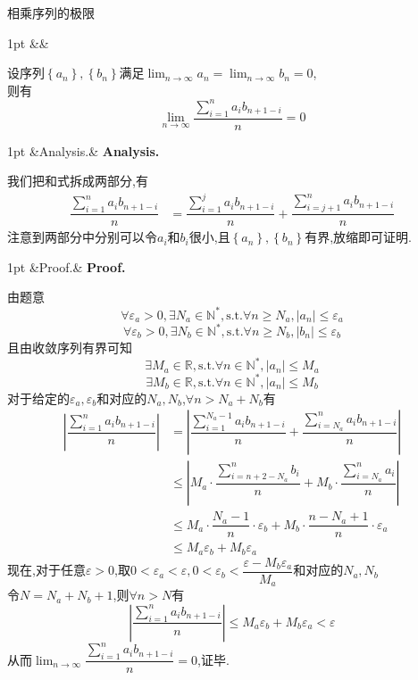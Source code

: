 \documentclass{ctexart}
\newcommand{\R}{\mathbb{R}}
\newcommand{\N}{\mathbb{N}}
\newcommand{\ep}{\varepsilon}
\newcommand{\st}{,\text{s.t.}}
\newenvironment{formal}[1][]{%
\def\FrameCommand{%
\hspace{1pt}%
{\color{DarkBlue}\vrule width 2pt}%
{\color{formalshade}\vrule width 4pt}%
\colorbox{formalshade}%
}%
\MakeFramed{\advance\hsize-\width\FrameRestore}%
\noindent\hspace{-4.55pt}%
\begin{adjustwidth}{}{1pt}%
\setlength{\parindent}{0pt}%
\vspace{3pt}%
\ifx&#1&\else %
    \textbf{#1}\par\vspace{1pt}%
\fi
}
{%
\vspace{2pt}%
\end{adjustwidth}\endMakeFramed%
}
\newenvironment{solution}[1][]{%
\def\FrameCommand{%
\hspace{1pt}%
{\color{solutionline}\vrule width 2pt}%
{\color{solutionshade}\vrule width 4pt}%
\colorbox{solutionshade}%
}%
\MakeFramed{\advance\hsize-\width\FrameRestore}%
\noindent\hspace{-4.55pt}%
\begin{adjustwidth}{}{1pt}%
\setlength{\parindent}{0pt}%
\vspace{3pt}%
\ifx&#1&\else %
    \textbf{#1}\par\vspace{1pt}%
\fi
}
{%
\vspace{2pt}%
\end{adjustwidth}\endMakeFramed%
}
\newenvironment{analyze}[1][]{%
\def\FrameCommand{%
\hspace{1pt}%
{\color{analyzeline}\vrule width 2pt}%
{\color{analyzeshade}\vrule width 4pt}%
\colorbox{analyzeshade}%
}%
\MakeFramed{\advance\hsize-\width\FrameRestore}%
\noindent\hspace{-4.55pt}%
\begin{adjustwidth}{}{1pt}%
\setlength{\parindent}{0pt}%
\vspace{3pt}%
\ifx&#1&\else %
    \textbf{#1}\par\vspace{1pt}%
\fi
}
{%
\vspace{2pt}%
\end{adjustwidth}\endMakeFramed%
}
\begin{document}
\pagestyle{empty}
\begin{center}
    \large 相乘序列的极限
\end{center}
\begin{formal}
    设序列$\left\{a_n\right\},\left\{b_n\right\}$满足$\displaystyle\lim_{n\to\infty}{a_n}=\lim_{n\to\infty}{b_n}=0$,\\
    则有$$\lim_{n\to\infty}{\dfrac{\sum_{i=1}^{n}{a_ib_{n+1-i}}}{n}}=0$$
\end{formal}
\begin{analyze}[Analysis.]
    我们把和式拆成两部分,有
    \begin{align*}
        \dfrac{\sum_{i=1}^{n}{a_ib_{n+1-i}}}{n}
        &= \dfrac{\sum_{i=1}^{j}{a_ib_{n+1-i}}}{n}+\dfrac{\sum_{i=j+1}^{n}{a_ib_{n+1-i}}}{n}
    \end{align*}
    注意到两部分中分别可以令$a_i$和$b_i$很小,且$\left\{a_n\right\},\left\{b_n\right\}$有界,放缩即可证明.
\end{analyze}
\begin{solution}[Proof.]
    由题意$$\forall \varepsilon_a>0,\exists N_a\in\mathbb{N}^*\st\forall n\geqslant N_a,\left\lvert a_n\right\rvert\leqslant\varepsilon_a$$
    $$\forall \varepsilon_b>0,\exists N_b\in\mathbb{N}^*\st\forall n\geqslant N_b,\left\lvert b_n\right\rvert\leqslant\varepsilon_b$$
    且由收敛序列有界可知$$\exists M_a\in\R\st\forall n\in\N^*,\left|a_n\right|\leqslant M_a$$
    $$\exists M_b\in\R\st\forall n\in\N^*,\left|a_n\right|\leqslant M_b$$
    对于给定的$\ep_a,\ep_b$和对应的$N_a,N_b$,$\forall n>N_a+N_b$有
    \begin{align*}
        \left|\dfrac{\sum_{i=1}^{n}{a_ib_{n+1-i}}}{n}\right|
        &= \left|\dfrac{\sum_{i=1}^{N_a-1}{a_ib_{n+1-i}}}{n}+\dfrac{\sum_{i=N_a}^{n}{a_ib_{n+1-i}}}{n}\right| \\
        &\leqslant \left|M_a\cdot\dfrac{\sum_{i=n+2-N_a}^{n}{b_i}}{n}+M_b\cdot\dfrac{\sum_{i=N_a}^{n}{a_i}}{n}\right| \\
        &\leqslant M_a\cdot\dfrac{N_a-1}{n}\cdot\ep_b+M_b\cdot\dfrac{n-N_a+1}{n}\cdot\ep_a \\
        &\leqslant M_a\ep_b+M_b\ep_a
    \end{align*}
    现在,对于任意$\ep>0$,取$0<\ep_a<\ep,0<\ep_b<\dfrac{\ep-M_b\ep_a}{M_a}$和对应的$N_a,N_b$ \\
    令$N=N_a+N_b+1$,则$\forall n>N$有$$\left|\dfrac{\sum_{i=1}^{n}{a_ib_{n+1-i}}}{n}\right|\leqslant M_a\ep_b+M_b\ep_a<\ep$$
    从而$\displaystyle\lim_{n\to\infty}{\dfrac{\sum_{i=1}^{n}{a_ib_{n+1-i}}}{n}}=0$,证毕.
\end{solution}
\end{document}
